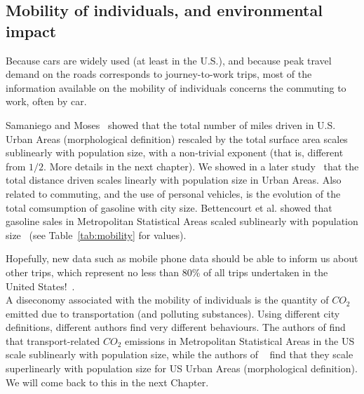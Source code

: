 \subsection{Mobility of individuals, and environmental impact}
\label{sub:mobility}

Because cars are widely used (at least in the U.S.), and because peak travel
demand on the roads corresponds to journey-to-work trips, most of the
information available on the mobility of individuals concerns the commuting to
work, often by car. 

Samaniego and Moses~\cite{Samaniego:2008} showed that the total number of miles
driven in U.S. Urban Areas (morphological definition) rescaled by the total
surface area scales sublinearly with population size, with a non-trivial
exponent (that is, different from $1/2$. More details in the next chapter). We
showed in a later study~\cite{Louf:2014_scaling} that the total distance driven
scales linearly with population size in Urban Areas.
Also related to commuting, and the use of personal vehicles, is the
evolution of the total comsumption of gasoline with city size.
Bettencourt et al. showed that gasoline sales in Metropolitan Statistical Areas
scaled sublinearly with population size~\cite{Bettencourt:2007} (see
Table~\ref{tab:mobility} for values). 

Hopefully, new data such as mobile phone data should be
able to inform us about other trips, which represent no less than 80\% of all
trips undertaken in the United States!~\cite{FHWA-PL-11-022}.\\

A diseconomy associated with the mobility of individuals is the
quantity of $CO_2$ emitted due to transportation (and polluting substances).
Using different city definitions, different authors find very different
behaviours. The authors of \cite{Fragkias:2013} find that transport-related
$CO_2$ emissions in Metropolitan Statistical Areas in the US scale sublinearly
with population size, while the authors of
~\cite{Louf:2014_mobility,Oliveira:2014} find that they scale superlinearly with
population size for US Urban Areas (morphological definition). We will come back
to this in the next Chapter.

